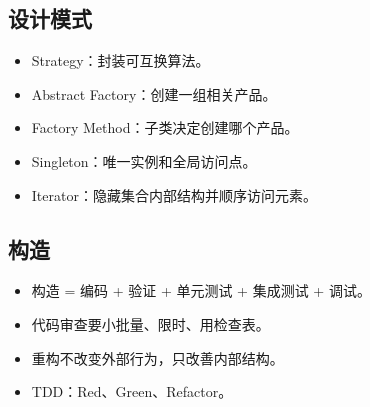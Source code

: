 \documentclass[UTF8,zihao=-4]{ctexart}
\begin{document}
\subsection{设计模式}

\begin{itemize}
\item Strategy：封装可互换算法。
\item Abstract Factory：创建一组相关产品。
\item Factory Method：子类决定创建哪个产品。
\item Singleton：唯一实例和全局访问点。
\item Iterator：隐藏集合内部结构并顺序访问元素。
\end{itemize}

\subsection{构造}

\begin{itemize}
\item 构造 = 编码 + 验证 + 单元测试 + 集成测试 + 调试。
\item 代码审查要小批量、限时、用检查表。
\item 重构不改变外部行为，只改善内部结构。
\item TDD：Red、Green、Refactor。
\end{itemize}
\end{document}
